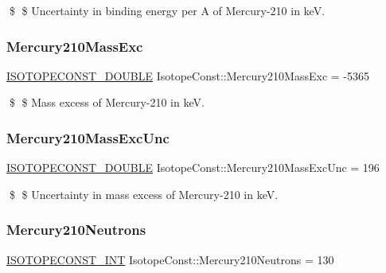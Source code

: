 \$ \$ Uncertainty in binding energy per A of Mercury-\/210 in keV. \mbox{\label{group___isotope_const-_mercury-_hg210_ga1c1c9df0b0864394ae30e42abaf3c407}} 
\subsubsection{\texorpdfstring{Mercury210\+Mass\+Exc}{Mercury210MassExc}}
{\footnotesize\ttfamily \mbox{\hyperlink{group___isotope_const-_macros_ga8f45a7272ce02c0b4c65c44636ed719a}{I\+S\+O\+T\+O\+P\+E\+C\+O\+N\+S\+T\+\_\+\+D\+O\+U\+B\+LE}} Isotope\+Const\+::\+Mercury210\+Mass\+Exc = -\/5365}

\$ \$ Mass excess of Mercury-\/210 in keV. \mbox{\label{group___isotope_const-_mercury-_hg210_ga0f26923a1eaaf02b7f48024b660eba70}} 
\subsubsection{\texorpdfstring{Mercury210\+Mass\+Exc\+Unc}{Mercury210MassExcUnc}}
{\footnotesize\ttfamily \mbox{\hyperlink{group___isotope_const-_macros_ga8f45a7272ce02c0b4c65c44636ed719a}{I\+S\+O\+T\+O\+P\+E\+C\+O\+N\+S\+T\+\_\+\+D\+O\+U\+B\+LE}} Isotope\+Const\+::\+Mercury210\+Mass\+Exc\+Unc = 196}

\$ \$ Uncertainty in mass excess of Mercury-\/210 in keV. \mbox{\label{group___isotope_const-_mercury-_hg210_ga38b172708fab52cc611464935191daa9}} 
\subsubsection{\texorpdfstring{Mercury210\+Neutrons}{Mercury210Neutrons}}
{\footnotesize\ttfamily \mbox{\hyperlink{group___isotope_const-_macros_ga5f18360b3e99483a35c32d789e62621c}{I\+S\+O\+T\+O\+P\+E\+C\+O\+N\+S\+T\+\_\+\+I\+NT}} Isotope\+Const\+::\+Mercury210\+Neutrons = 130}

